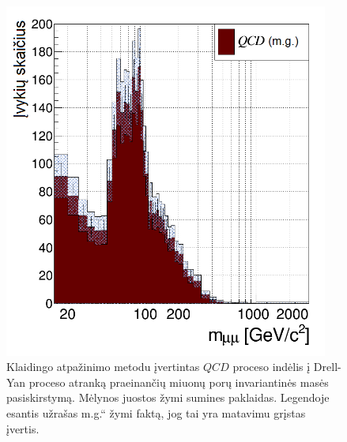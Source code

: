 \documentclass[a4paper, 12pt, oneside]{article}
\newcommand{\ltq}[1]{{\quotedblbase{}#1\textquotedblleft{}}}
\newcommand{\QCD}{QC\! D}
\newlength\q
\begin{document}
\begin{figure}[b!]
\begin{minipage}{0.48\textwidth}
		\includegraphics[width=0.95\textwidth]{Kursinis3/QCDest.png}
		\vspace{-0.35cm}
		\caption{\label{fig:QCDest}
			Klaidingo atpažinimo metodu įvertintas $\QCD$ proceso indėlis į Drell-Yan proceso atranką praeinančių miuonų
			porų invariantinės masės pasiskirstymą. Mėlynos juostos žymi sumines paklaidas. Legendoje esantis užrašas \ltq{m.g.}
			žymi faktą, jog tai yra matavimu grįstas įvertis.
		}
	\end{minipage}
	

\end{figure}
\end{document}
